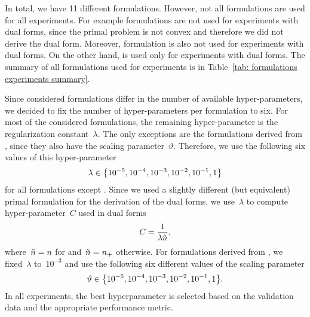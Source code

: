 In total, we have 11 different formulations. However, not all formulations are used for all experiments. For example \GrillNP formulations are not used for experiments with dual forms, since the primal problem is not convex and therefore we did not derive the dual form. Moreover, \BaseLine formulation is also not used for experiments with dual forms. On the other hand, \SVM is used only for experiments with dual forms. The summary of all formulations used for experiments is in Table~\ref{tab: formulations experiments summary}.

Since considered formulations differ in the number of available hyper-parameters, we decided to fix the number of hyper-parameters per formulation to six. For most of the considered formulations, the remaining hyper-parameter is the regularization constant~$\lambda$. The only exceptions are the formulations derived from \PatMatNP, since they also have the scaling parameter~$\vartheta.$ Therefore, we use the following six values of this hyper-parameter
\begin{equation*}
  \lambda \in \Brac[c]{10^{-5}, 10^{-4}, 10^{-3}, 10^{-2}, 10^{-1}, 1}
\end{equation*}
for all formulations except \PatMatNP. Since we used a slightly different (but equivalent) primal formulation for the derivation of the dual forms, we use~$\lambda$ to compute hyper-parameter~$C$ used in dual forms
\begin{equation*}
  C = \frac{1}{\lambda \tilde{n}},
\end{equation*}
where~$\tilde{n} = n$ for \SVM and~$\tilde{n} = n_{+}$ otherwise. For formulations derived from \PatMatNP, we fixed~$\lambda$ to~$10^{-3}$ and use the following six different values of the scaling parameter
\begin{equation*}
  \vartheta \in \Brac[c]{10^{-5}, 10^{-4}, 10^{-3}, 10^{-2}, 10^{-1}, 1}.
\end{equation*}
In all experiments, the best hyperparameter is selected based on the validation data and the appropriate performance metric.

